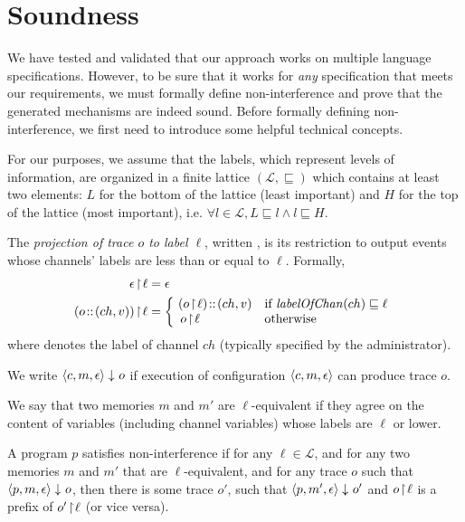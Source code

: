 \documentclass[conference]{IEEEtran}
\begin{document}
\pagebreak
\section{Soundness}\label{section:soundness}
We have tested and validated that our approach works on multiple language specifications. However, to be sure that it works for \emph{any} specification that meets our requirements, we must formally define non-interference and prove that the generated mechanisms are indeed sound. Before formally defining non-interference, we first need to introduce some helpful technical concepts.

For our purposes, we assume that the labels, which represent levels of information, are organized in a finite lattice ${(\mathcal{L},\sqsubseteq)}$ which contains at least two elements: $L$ for the bottom of the lattice (least important) and $H$ for the top of the lattice (most important), i.e. $\forall l \in \mathcal{L}, L \sqsubseteq l \wedge l  \sqsubseteq H$.

The \emph{projection of trace $o$ to label $\ell$}, written , is its restriction  to output events whose channels' labels are less than or equal to $\ell$.  Formally,
\begin{align*}
\proj{\epsilon}{\ell}      & = \epsilon     \\
\proj{(o\!::\!(ch,v))}{\ell} & = \left \{   \begin{array}{ll}
\!(\proj{o}{\ell})\!::\!(ch,v)\!\! &  \text{ if }   \levelOfChan{ch}   \sqsubseteq \ell \\
\proj{o}{\ell}  &   \text{ otherwise}
\end{array} \right.
\end{align*}
where  denotes the label of channel $ch$ (typically specified by the administrator).

We write $\langle c, m, \epsilon \rangle\downarrow_{ }o$ if execution of configuration $\langle c, m, \epsilon \rangle$
can produce trace $o$.

We say that two memories $m$ and $m'$ are $\ell$-equivalent if they agree on the content of variables  (including channel variables) whose labels are $\ell$ or lower.

\begin{definition}
A program $p$ satisfies non-interference if for any $\ell \in \mathcal{L}$, and for any two memories $m$ and $m'$ that are $\ell$-equivalent, and for any trace $o$ such that $\langle p, m, \epsilon \rangle\downarrow_{}o $, then there is some trace $o'$, such that $\langle p, m', \epsilon \rangle\downarrow_{}o'$ and ${o \! \upharpoonright \! {\ell}}$ is a prefix of ${o' \! \upharpoonright \! {\ell}}$ (or vice versa).
\end{definition}
\end{document}
